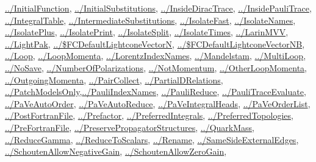\documentclass[../FeynCalcManual.tex]{subfiles}
\begin{document}
\begin{itemize}
  \hyperlink{../initialfunction}{../InitialFunction},
  \hyperlink{../initialsubstitutions}{../InitialSubstitutions},
  \hyperlink{../insidediractrace}{../InsideDiracTrace},
  \hyperlink{../insidepaulitrace}{../InsidePauliTrace},
  \hyperlink{../integraltable}{../IntegralTable},
  \hyperlink{../intermediatesubstitutions}{../IntermediateSubstitutions},
  \hyperlink{../isolatefast}{../IsolateFast},
  \hyperlink{../isolatenames}{../IsolateNames},
  \hyperlink{../isolateplus}{../IsolatePlus},
  \hyperlink{../isolateprint}{../IsolatePrint},
  \hyperlink{../isolatesplit}{../IsolateSplit},
  \hyperlink{../isolatetimes}{../IsolateTimes},
  \hyperlink{../larinmvv}{../LarinMVV},
  \hyperlink{../lightpak}{../LightPak},
  \hyperlink{../dollarfcdefaultlightconevectorn}{../\$FCDefaultLightconeVectorN},
  \hyperlink{../dollarfcdefaultlightconevectornb}{../\$FCDefaultLightconeVectorNB},
  \hyperlink{../loop}{../Loop},
  \hyperlink{../loopmomenta}{../LoopMomenta},
  \hyperlink{../lorentzindexnames}{../LorentzIndexNames},
  \hyperlink{../mandelstam}{../Mandelstam},
  \hyperlink{../multiloop}{../MultiLoop},
  \hyperlink{../nosave}{../NoSave},
  \hyperlink{../numberofpolarizations}{../NumberOfPolarizations},
  \hyperlink{../notmomentum}{../NotMomentum},
  \hyperlink{../otherloopmomenta}{../OtherLoopMomenta},
  \hyperlink{../outgoingmomenta}{../OutgoingMomenta},
  \hyperlink{../paircollect}{../PairCollect},
  \hyperlink{../partialdrelations}{../PartialDRelations},
  \hyperlink{../patchmodelsonly}{../PatchModelsOnly},\hyperlink{../pauliindexnames}{../PauliIndexNames},
  \hyperlink{../paulireduce}{../PauliReduce},
  \hyperlink{../paulitraceevaluate}{../PauliTraceEvaluate},
  \hyperlink{../paveautoorder}{../PaVeAutoOrder},
  \hyperlink{../paveautoreduce}{../PaVeAutoReduce},
  \hyperlink{../paveintegralheads}{../PaVeIntegralHeads},
  \hyperlink{../paveorderlist}{../PaVeOrderList},
  \hyperlink{../postfortranfile}{../PostFortranFile},
  \hyperlink{../prefactor}{../Prefactor},
  \hyperlink{../preferredintegrals}{../PreferredIntegrals},
  \hyperlink{../preferredtopologies}{../PreferredTopologies},
  \hyperlink{../prefortranfile}{../PreFortranFile},
  \hyperlink{../preservepropagatorstructures}{../PreservePropagatorStructures},
  \hyperlink{../quarkmass}{../QuarkMass},
  \hyperlink{../reducegamma}{../ReduceGamma},
  \hyperlink{../reducetoscalars}{../ReduceToScalars},
  \hyperlink{../rename}{../Rename},
  \hyperlink{../samesideexternaledges}{../SameSideExternalEdges},
  \hyperlink{../schoutenallownegativegain}{../SchoutenAllowNegativeGain},
  \hyperlink{../schoutenallowzerogain}{../SchoutenAllowZeroGain},

\end{itemize}
\end{document}

